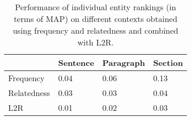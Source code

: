 
\begin{table}[t]
\caption{Performance of individual entity rankings (in terms of MAP) on different contexts obtained using frequency and relatedness and combined with L2R.}
\label{tab:Results-Entity-Rankings-Freq-And-Rel}
\begin{tabular}{@{}llll@{}}
 \toprule
            & Sentence & Paragraph & Section \\ \midrule
Frequency   & 0.04     & 0.06      & 0.13    \\
Relatedness & 0.03     & 0.03      & 0.04    \\ \midrule
L2R         & 0.01     & 0.02      & 0.03   \\
 \bottomrule
\end{tabular}
\end{table}